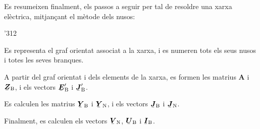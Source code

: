 Es resumeixen finalment, els passos a seguir per tal de resoldre una
xarxa el\`{e}ctrica, mitjan\c{c}ant el m\`{e}tode dels nusos:
\begin{dingautolist}{'312}
   \item Es representa el graf orientat associat a la xarxa, i es numeren tots els seus nusos i totes les seves branques.
   \item A partir del graf orientat i dels elements de la xarxa, es formen les matrius $\boldsymbol{A}$ i $\mcmplx{Z}\ped{B}$, i els vectors $\mcmplx{E}\ped{B}'$ i $\mcmplx{J}\ped{B}'$.
   \item Es calculen les matrius $\mcmplx{Y}\ped{B}$ i $\mcmplx{Y}\ped{N}$, i els vectors $\mcmplx{J}\ped{B}$ i $\mcmplx{J}\ped{N}$.
   \item Finalment, es calculen els vectors $\mcmplx{V}\ped{N}$, $\mcmplx{U}\ped{B}$ i $\mcmplx{I}\ped{B}$.
\end{dingautolist}

